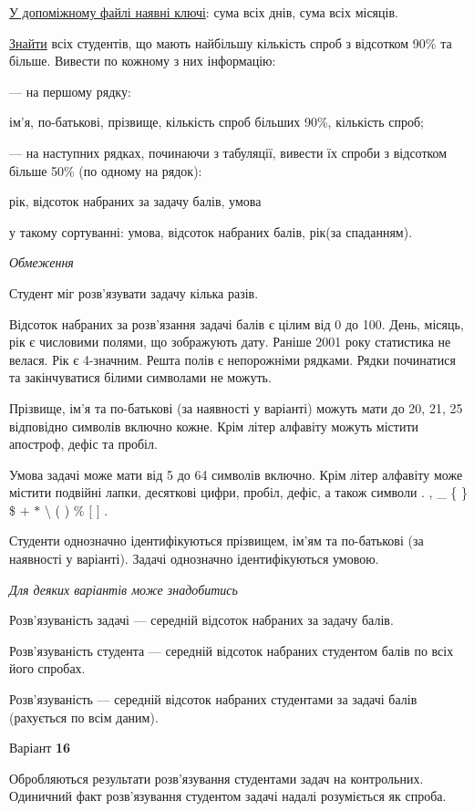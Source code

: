 \documentclass[11pt, ukrainian]{article}
\begin{document}
\underline{У допоміжному файлі наявні ключі}: сума всіх днів, сума всіх місяців.

\underline{Знайти} всіх студентів, що мають найбільшу кількість спроб з відсотком 90\% та більше. Вивести по кожному з них інформацію:\par
{\noindent}--- на першому рядку:\par
ім’я, по-батькові, прізвище, кількість спроб більших 90\%, кількість спроб;

{\noindent}--- на наступних рядках, починаючи з табуляції, вивести їх спроби з відсотком більше 50\% (по одному на рядок):\par
рік, відсоток набраних за задачу балів, умова

{\noindent}у такому сортуванні: умова, відсоток набраних балів, рік(за спаданням).


\bigskip\textit{Обмеження}

Студент міг розв’язувати задачу кілька разів.

Відсоток набраних за розв’язання задачі балів є цілим від 0 до 100.
День, місяць, рік є числовими полями, що зображують дату.
Раніше 2001 року статистика не велася. Рік є 4-значним.
Решта полів є непорожніми рядками.
Рядки починатися та закінчуватися білими символами не можуть.

Прізвище, ім’я та по-батькові (за наявності у варіанті) можуть мати до 20, 21, 25 відповідно символів включно кожне. 
Крім літер алфавіту можуть містити апостроф, дефіс та пробіл.

Умова задачі може мати від 5 до 64 символів включно.
Крім літер алфавіту може містити подвійні лапки, десяткові цифри, пробіл, дефіс,
а також символи . , \_ \{ \} \$ $+$ $*$ {\textbackslash} ( ) \% $[$ $]$ .

Студенти однозначно ідентифікуються прізвищем, ім’ям та по-батькові (за наявності у варіанті).
Задачі однозначно ідентифікуються умовою.

\bigskip\textit{Для деяких варіантів може знадобитись}

Розв'язуваність задачі --- середній відсоток набраних за задачу балів.

Розв'язуваність студента --- середній відсоток набраних студентом балів по всіх його спробах.

Розв'язуваність --- середній відсоток набраних студентами за задачі балів (рахується по всім даним).


\par
\newpage
{\center Варіант  \No \textbf { 16 }\par}
\bigskip
Обробляються результати розв’язування студентами задач на контрольних.
Одиничний факт роз\-в’я\-зу\-вання студентом задачі надалі розуміється як спроба.
\end{document}
